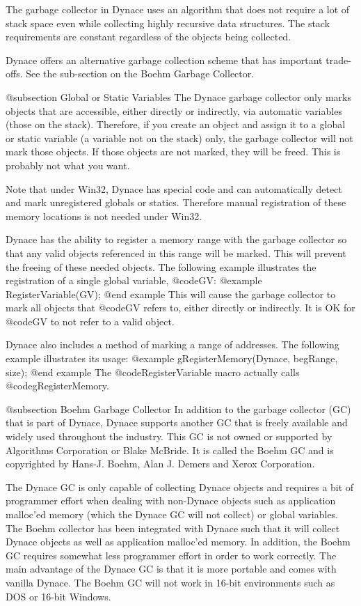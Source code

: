 The garbage collector in Dynace uses an algorithm that does not require a
lot of stack space even while collecting highly recursive data
structures.  The stack requirements are constant regardless of the
objects being collected.

Dynace offers an alternative garbage collection scheme that has important
trade-offs.  See the sub-section on the Boehm Garbage Collector.



@subsection Global or Static Variables
The Dynace garbage collector only marks objects that are accessible, either
directly or indirectly, via automatic variables (those on the stack).
Therefore, if you create an object and assign it to a global or static
variable (a variable not on the stack) only, the garbage collector will
not mark those objects.  If those objects are not marked, they will be
freed.  This is probably not what you want.

Note that under Win32, Dynace has special code and can automatically
detect and mark unregistered globals or statics.  Therefore manual
registration of these memory locations is not needed under Win32.

Dynace has the ability to register a memory range with the garbage collector
so that any valid objects referenced in this range will be marked.  This
will prevent the freeing of these needed objects.  The following example
illustrates the registration of a single global variable, @code{GV}:
@example
        RegisterVariable(GV);
@end example
This will cause the garbage collector to mark all objects that @code{GV}
refers to, either directly or indirectly.  It is OK for @code{GV} to not
refer to a valid object.

Dynace also includes a method of marking a range of addresses.  The following
example illustrates its usage:
@example
        gRegisterMemory(Dynace, begRange, size);
@end example
The @code{RegisterVariable} macro actually calls @code{gRegisterMemory}.




@subsection Boehm Garbage Collector
In addition to the garbage collector (GC) that is part of Dynace,
Dynace supports another GC that is freely available and widely used
throughout the industry.  This GC is not owned or supported by
Algorithms Corporation or Blake McBride.  It is called the Boehm GC and is
copyrighted by Hans-J. Boehm, Alan J. Demers and Xerox Corporation.

The Dynace GC is only capable of collecting Dynace objects and requires
a bit of programmer effort when dealing with non-Dynace objects such as
application malloc'ed memory (which the Dynace GC will not collect) or
global variables.  The Boehm collector has been integrated with Dynace
such that it will collect Dynace objects as well as application
malloc'ed memory.  In addition, the Boehm GC requires somewhat less
programmer effort in order to work correctly.  The main advantage of the
Dynace GC is that it is more portable and comes with vanilla Dynace.
The Boehm GC will not work in 16-bit environments such as DOS or 16-bit
Windows.

